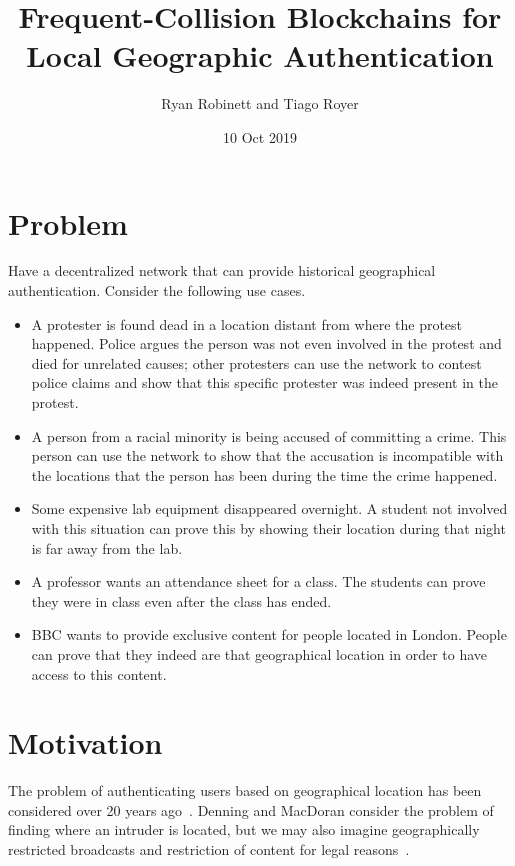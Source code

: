 \documentclass{article}
\title{Frequent-Collision Blockchains for Local Geographic Authentication}
\author{Ryan Robinett and Tiago Royer}
\date{10 Oct 2019}
\begin{document}
\maketitle

\section*{Problem}

Have a decentralized network
that can provide historical geographical authentication.
Consider the following use cases.

\begin{itemize}
	\item A protester is found dead in a location distant from where the protest happened.
		Police argues the person was not even involved in the protest
		and died for unrelated causes;
		other protesters can use the network to contest police claims
		and show that this specific protester was indeed present in the protest.

	\item A person from a racial minority is being accused of committing a crime.
		This person can use the network to show that the accusation
		is incompatible with the locations that the person has been
		during the time the crime happened.

	\item Some expensive lab equipment disappeared overnight.
		A student not involved with this situation
		can prove this by showing their location during that night
		is far away from the lab.

	\item A professor wants an attendance sheet for a class.
		The students can prove they were in class
		even after the class has ended.

	\item BBC wants to provide exclusive content for people located in London.
		People can prove that they indeed are that geographical location
		in order to have access to this content.
\end{itemize}

\section*{Motivation}

The problem of authenticating users based on geographical location
has been considered over 20 years ago~\cite{denning_1996}.
Denning and MacDoran consider the problem of finding where an intruder is located,
but we may also imagine geographically restricted broadcasts
and restriction of content for legal reasons~\cite{gdpr}.
\end{document}
